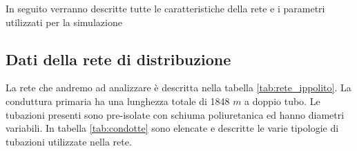 \documentclass[laurea,oneside,11pt]{USiena_tesiLM}
\begin{document}
In seguito verranno descritte tutte le caratteristiche della rete e i parametri utilizzati per la simulazione

\subsection{Dati della rete di distribuzione}
La rete che andremo ad analizzare è descritta nella tabella \ref{tab:rete_ippolito}. La conduttura primaria ha una lunghezza totale di 1848 $m$ a doppio tubo. Le tubazioni presenti sono pre-isolate con schiuma poliuretanica ed hanno diametri variabili. In tabella \ref{tab:condotte} sono elencate e descritte le varie tipologie di tubazioni utilizzate nella rete.


\begin{table}[!ht]
\centering
{}
\end{table}
\end{document}
